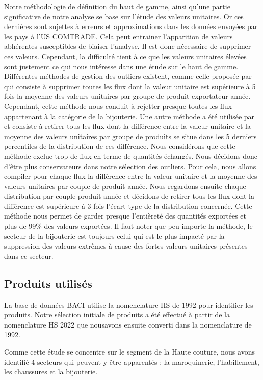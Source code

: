 \documentclass[french,10pt,a4paper]{article}
\begin{document}
Notre méthodologie de définition du haut de gamme, ainsi qu'une partie significative de notre analyse se base sur l'étude des valeurs unitaires. Or ces dernières sont sujettes à erreurs et approximations dans les données envoyées par les pays à l'US COMTRADE. Cela peut entrainer l'apparition de valeurs abhérentes susceptibles de biaiser l'analyse. Il est donc nécessaire de supprimer ces valeurs. Cependant, la difficulté tient à ce que les valeurs unitaires élevées sont justement ce qui nous intéresse dans une étude sur le haut de gamme. Différentes méthodes de gestion des outliers existent, comme celle proposée par \cite{Hallak2006} qui consiste à supprimer toutes les flux dont la valeur unitaire est supérieure à 5 fois la moyenne des valeurs unitaires par groupe de produit-exportateur-année. Cependant, cette méthode nous conduit à rejetter presque toutes les flux appartenant à la catégorie de la bijouterie. Une autre méthode a été utilisée par \cite{Fontagne2013} et consiste à retirer tous les flux dont la différence entre la valeur unitaire et la moyenne des valeurs unitaires par groupe de produits se situe dans les 5 derniers percentiles de la distribution de ces différence. Nous considérons que cette méthode exclue trop de flux en terme de quantités échangés. Nous décidons donc d'être plus conservateurs dans notre sélection des outliers. Pour cela, nous allons compiler pour chaque flux la différence entre la valeur unitaire et la moyenne des valeurs unitaires par couple de produit-année. Nous regardons ensuite chaque distribution par couple produit-année et décidons de retirer tous les flux dont la différence est supérieure à 3 fois l'écart-type de la distribution concernée. Cette méthode nous permet de garder presque l'entièreté des quantités exportées et plus de 99\% des valeurs exportées. Il faut noter que peu importe la méthode, le secteur de la bijouterie est toujours celui qui est le plus impacté par la suppression des valeurs extrêmes à cause des fortes valeurs unitaires présentes dans ce secteur. 


\subsection{Produits utilisés}

La base de données BACI utilise la nomenclature HS de 1992 pour identifier les produits. Notre sélection initiale de produits a été effectué à partir de la nomenclature HS 2022 que nousavons ensuite converti dans la nomenclature de 1992.

Comme cette étude se concentre sur le segment de la Haute couture, nous avons identifié 4 secteurs qui peuvent y être apparentés : la maroquinerie, l'habillement, les chaussures et la bijouterie.
\end{document}
